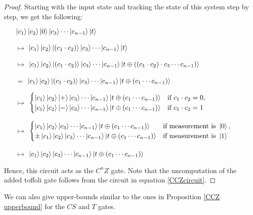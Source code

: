 \documentclass[12pt]{dalthesis}
\begin{document}
\begin{proof}
Starting with the input state and tracking the state of this system step by step, we get the following: 
\begin{itemize}
\item[] $\ket{c_1}\ket{c_2}\ket{0}\ket{c_3} \cdots \ket{c_{n-1}}\ket{t}$
\item[$\mapsto$] $\ket{c_1}\ket{c_2}\ket{(c_1 \cdot c_2)}\ket{c_3} \cdots \ket{c_{n-1}}\ket{t}$
\item[$\mapsto$] $\ket{c_1}\ket{c_2}\ket{(c_1 \cdot c_2)}\ket{c_3} \cdots \ket{c_{n-1}} \ket{t \oplus ((c_1 \cdot c_2) \cdot c_3 \cdots c_{n-1})}$
\item[$=$] $\ket{c_1}\ket{c_2}\ket{(c_1 \cdot c_2)}\ket{c_3} \cdots \ket{c_{n-1}} \ket{t \oplus (c_1 \cdots c_{n-1})}$
\item[$\mapsto$] $\begin{cases} \ket{c_1}\ket{c_2}\ket{+}\ket{c_3} \cdots \ket{c_{n-1}} \ket{t \oplus (c_1 \cdots c_{n-1})} & \mbox{if } c_1 \cdot c_2 = 0, \\
\ket{c_1}\ket{c_2}\ket{-}\ket{c_3} \cdots \ket{c_{n-1}} \ket{t \oplus (c_1 \cdots c_{n-1})} & \mbox{if } c_1 \cdot c_2 = 1 \end{cases}$
\item[$\mapsto$] $\begin{cases} \ket{c_1}\ket{c_2}\ket{c_3} \cdots \ket{c_{n-1}} \ket{t \oplus (c_1 \cdots c_{n-1})} & \mbox{if measurement is } \ket{0} , \\
\pm \ket{c_1}\ket{c_2}\ket{c_3} \cdots \ket{c_{n-1}} \ket{t \oplus (c_1 \cdots c_{n-1})} & \mbox{if measurement is } \ket{1} \end{cases}$
\item[$\mapsto$] $\ket{c_1}\ket{c_2}\ket{c_3} \cdots \ket{c_{n-1}}\ket{t \oplus (c_1 \cdots c_{n-1})}$
\end{itemize}
Hence, this circuit acts as the $C^nZ$ gate. Note that the uncomputation of the added toffoli gate follows from the circuit in equation \ref{CCZcircuit}.
\end{proof}


We can also give upper-bounds similar to the ones in Proposition \ref{CCZ upperbound} for the $CS$ and $T$ gates.
\end{document}
